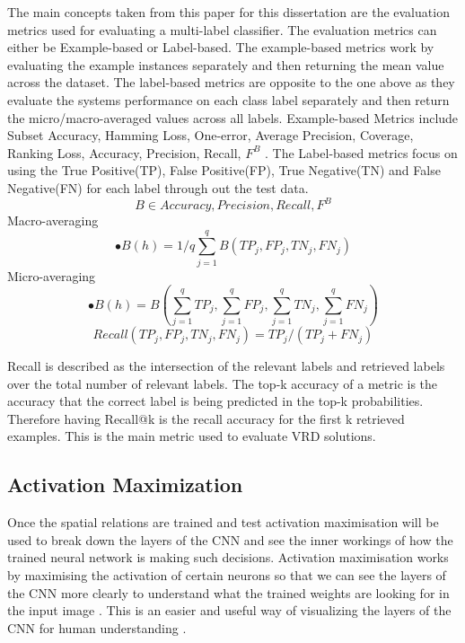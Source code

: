 \documentclass{csfyp}
\begin{document}
The main concepts taken from this paper for this dissertation are the evaluation metrics used for evaluating a multi-label classifier. The evaluation metrics can either be Example-based or Label-based. The example-based metrics work by evaluating the example instances separately and then returning the mean value across the dataset. The label-based metrics are opposite to the one above as they evaluate the systems performance on each class label separately and then return the micro/macro-averaged values across all labels. Example-based Metrics include Subset Accuracy, Hamming Loss, One-error, Average Precision, Coverage, Ranking Loss, Accuracy, Precision, Recall, $F^B$ . The Label-based metrics focus on using the True Positive(TP), False Positive(FP), True Negative(TN) and False Negative(FN) for each label through out the test data.
\begin{equation}
B \in { Accuracy, Precision, Recall, F^B} 
\end{equation}
Macro-averaging
\begin{equation}
•B(h) = {1}/{q}\sum_{j=1}^{q} B(TP_j,FP_j,TN_j,FN_j)
\end{equation}
Micro-averaging
\begin{equation}
•B(h) = B(\sum_{j=1}^{q} TP_j,\sum_{j=1}^{q} FP_j,\sum_{j=1}^{q} TN_j,\sum_{j=1}^{q} FN_j)
\end{equation}
\begin{equation}
Recall(TP_j,FP_j,TN_j,FN_j) = TP_j/(TP_j + FN_j)
\end{equation}

Recall is described as the intersection of the relevant labels and retrieved labels over the total number of relevant labels. The top-k accuracy of a metric is the accuracy that the correct label is being predicted in the top-k probabilities. Therefore having Recall@k is the recall accuracy for the first k retrieved examples. This is the main metric used to evaluate VRD solutions. 

\subsection{Activation Maximization}
Once the spatial relations are trained and test activation maximisation will be used to break down the layers of the CNN and see the inner workings of how the trained neural network is making such decisions. Activation maximisation works by maximising the activation of certain neurons so that we can see the layers of the CNN more clearly to understand what the trained weights are looking for in the input image . This is an easier and useful way of visualizing the layers of the CNN for human understanding . 
\end{document}
